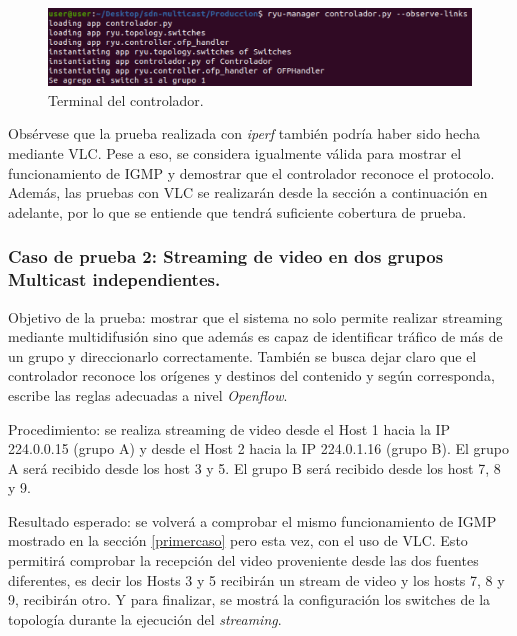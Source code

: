 \documentclass[12pt,a4paper,oneside]{book}
\begin{document}
\begin{figure}[ht]
 \centering
 \includegraphics[width=1\textwidth]{fotos/5_Pruebas/1_topo_lineales/Casos/1/contr_reconocimiento.png}
 \caption{Terminal del controlador.}
 \label{contr_add_grupo_mcastl}
\end{figure}

\vspace{0.5cm}

Obsérvese que la prueba realizada con \textit{iperf} también podría haber sido hecha mediante VLC. Pese a eso, se considera igualmente válida para mostrar el funcionamiento de IGMP y demostrar que el controlador reconoce el protocolo. Además, las pruebas con VLC se realizarán desde la sección a continuación en adelante, por lo que se entiende que tendrá suficiente cobertura de prueba.

\subsubsection{Caso de prueba 2: Streaming de video en dos grupos Multicast independientes.} 

Objetivo de la prueba: mostrar que el sistema no solo permite realizar streaming mediante multidifusión sino que además es capaz de identificar tráfico de más de un grupo y direccionarlo correctamente. También se busca dejar claro que el controlador reconoce los orígenes y destinos del contenido y según corresponda, escribe las reglas adecuadas a nivel \textit{Openflow}.

\vspace{0.5cm}
Procedimiento: se realiza streaming de video desde el Host 1 hacia la IP 224.0.0.15 (grupo A) y desde el Host 2 hacia la IP 224.0.1.16 (grupo B). El grupo A será recibido desde los host 3 y 5. El grupo B será recibido desde los host 7, 8 y 9.

\vspace{0.5cm}
Resultado esperado: se volverá a comprobar el mismo funcionamiento de IGMP mostrado en la sección \ref{primercaso} pero esta vez, con el uso de VLC. Esto permitirá comprobar la recepción del video proveniente desde las dos fuentes diferentes, es decir los Hosts 3 y 5 recibirán un stream de video y los hosts 7, 8 y 9, recibirán otro. Y para finalizar, se mostrá la configuración los switches de la topología durante la ejecución del \textit{streaming}.
\end{document}
